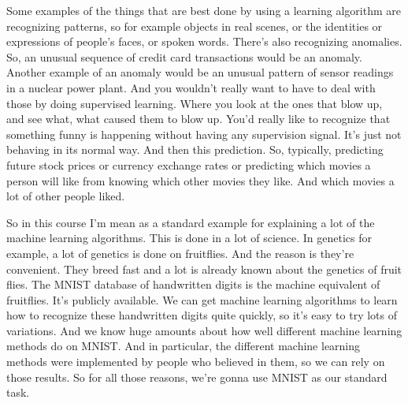 \begin{multicols}{2}
\begin{footnotesize}
Some examples of the things that are best done by using a learning algorithm are recognizing patterns, so for example objects in real scenes, or the identities or expressions of people's faces, or spoken words. There's also recognizing anomalies. So, an unusual sequence of credit card transactions would be an anomaly. Another example of an anomaly would be an unusual pattern of sensor readings in a nuclear power plant. And you wouldn't really want to have to deal with those by doing supervised learning. Where you look at the ones that blow up, and see what, what caused them to blow up. You'd really like to recognize that something funny is happening without having any supervision signal. It's just not behaving in its normal way. And then this prediction. So, typically, predicting future stock prices or currency exchange rates or predicting which movies a person will like from knowing which other movies they like. And which movies a lot of other people liked.

So in this course I'm mean as a standard example for explaining a lot of the machine learning algorithms. This is done in a lot of science. In genetics for example, a lot of genetics is done on fruitflies. And the reason is they're convenient. They breed fast and a lot is already known about the genetics of fruit flies. The MNIST database of handwritten digits is the machine equivalent of fruitflies. It's publicly available. We can get machine learning algorithms to learn how to recognize these handwritten digits quite quickly, so it's easy to try lots of variations. And we know huge amounts about how well different machine learning methods do on MNIST. And in particular, the different machine learning methods were implemented by people who believed in them, so we can rely on those results. So for all those reasons, we're gonna use MNIST as our standard task.


\end{footnotesize}
\end{multicols}
